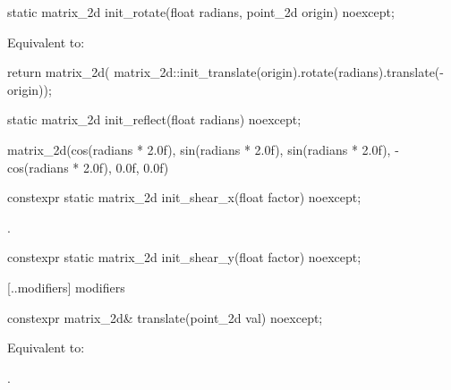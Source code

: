 %
\begin{itemdecl}
static matrix_2d init_rotate(float radians, point_2d origin) noexcept;
\end{itemdecl}
\begin{itemdescr}
\pnum
\effects
Equivalent to:
\begin{codeblock}
return matrix_2d(
  matrix_2d::init_translate(origin).rotate(radians).translate(-origin));
\end{codeblock}
\end{itemdescr}

%
\begin{itemdecl}
static matrix_2d init_reflect(float radians) noexcept;
\end{itemdecl}
\begin{itemdescr}
\pnum
\returns
\begin{codeblock}
\end{codeblock}
matrix_2d(cos(radians * 2.0f), sin(radians * 2.0f), sin(radians * 2.0f),
  -cos(radians * 2.0f), 0.0f, 0.0f)
\end{itemdescr}

%
\begin{itemdecl}
constexpr static matrix_2d init_shear_x(float factor) noexcept;
\end{itemdecl}
\begin{itemdescr}
\pnum
\returns
{}.
\end{itemdescr}

%
\begin{itemdecl}
constexpr static matrix_2d init_shear_y(float factor) noexcept;
\end{itemdecl}
\begin{itemdescr}
\pnum
\returns
{}
\end{itemdescr}

 [\iotwod.\matrixtwod.modifiers] { modifiers}

%
\begin{itemdecl}
constexpr matrix_2d& translate(point_2d val) noexcept;
\end{itemdecl}
\begin{itemdescr}
\pnum
\effects
Equivalent to: 

\pnum
\returns
{}.
\end{itemdescr}

